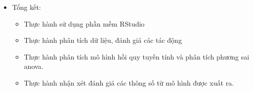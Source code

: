 \documentclass[a4paper]{article}
\theoremstyle{definition}
\begin{document}
\begin{itemize}
\begin{itemize}
    
    \end{itemize}
\item Tổng kết:\\
\begin{itemize}
\subsection{Tổng kết:}
\item Thực hành sử dụng phần mềm RStudio
\item Thực hành phân tích dữ liệu, đánh giá các tác động 
\item Thực hành phân tích mô hình hồi quy tuyến tính và phân tích phương sai anova.
\item Thực hành nhận xét đánh giá các thông số từ mô hình được xuất ra. 
\end{itemize}
    \end{itemize}
\end{document}
